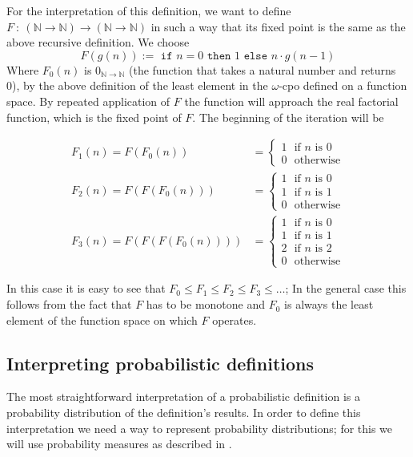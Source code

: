 \documentclass[11pt, leqno, titlepage]{article}
\theoremstyle{definition}
\begin{document}
For the interpretation of this definition, we want to define $F~:~(\mathbb{N} \to
\mathbb{N}) \to (\mathbb{N} \to \mathbb{N})$ in such a way that its fixed point is
the same as the above recursive definition. We choose
$$F(g(n)):=\texttt{ if }n=0\texttt{ then }1\texttt{ else }n\cdot g(n-1)$$
Where $F_0(n)$ is $0_{\mathbb{N} \to \mathbb{N}}$ (the function that takes a natural
number and returns 0), by the above definition of the least element in the
$\omega$-cpo defined on a function space. By repeated application of $F$ the function
will approach the real factorial function, which is the fixed point of $F$. The
beginning of the iteration will be

\begin{align*}
  F_1(n) = F(F_0(n)) & = \begin{cases}
                           1~~~\text{if }n\text{ is 0}\\
                           0~~~\text{otherwise}
                         \end{cases}
  \\
  F_2(n) = F(F(F_0(n))) & = \begin{cases}
                             1~~~\text{if }n\text{ is 0}\\
                             1~~~\text{if }n\text{ is 1}\\
                             0~~~\text{otherwise}
                           \end{cases}
  \\
  F_3(n) = F(F(F(F_0(n)))) & = \begin{cases}
                                1~~~\text{if }n\text{ is 0}\\
                                1~~~\text{if }n\text{ is 1}\\
                                2~~~\text{if }n\text{ is 2}\\
                                0~~~\text{otherwise}
                              \end{cases}
\end{align*}

In this case it is easy to see that $F_0 \leq F_1 \leq F_2 \leq F_3 \leq \dots$; In
the general case this follows from the fact that $F$ has to be monotone and $F_0$ is
always the least element of the function space on which $F$ operates.


\subsection{Interpreting probabilistic definitions}\label{sec:prob-interp}
The most straightforward interpretation of a probabilistic definition is a
probability distribution of the definition's results. In order to define this
interpretation we need a way to represent probability distributions; for this we will
use probability measures as described in \cite{rml-paper}.
\end{document}
